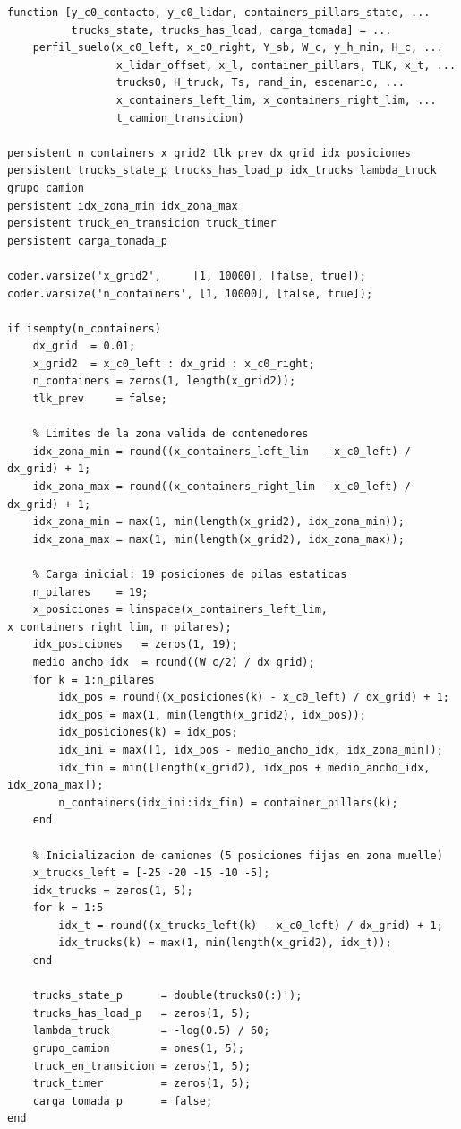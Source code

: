\documentclass[12pt, a4paper]{article}
\begin{document}
\begin{lstlisting}[style=matlab, caption={Firma e inicialización de la \textit{MATLAB Function} \texttt{perfil\_suelo}.}, label=lst:perfil-suelo-init]
function [y_c0_contacto, y_c0_lidar, containers_pillars_state, ...
          trucks_state, trucks_has_load, carga_tomada] = ...
    perfil_suelo(x_c0_left, x_c0_right, Y_sb, W_c, y_h_min, H_c, ...
                 x_lidar_offset, x_l, container_pillars, TLK, x_t, ...
                 trucks0, H_truck, Ts, rand_in, escenario, ...
                 x_containers_left_lim, x_containers_right_lim, ...
                 t_camion_transicion)

persistent n_containers x_grid2 tlk_prev dx_grid idx_posiciones
persistent trucks_state_p trucks_has_load_p idx_trucks lambda_truck grupo_camion
persistent idx_zona_min idx_zona_max
persistent truck_en_transicion truck_timer
persistent carga_tomada_p

coder.varsize('x_grid2',     [1, 10000], [false, true]);
coder.varsize('n_containers', [1, 10000], [false, true]);

if isempty(n_containers)
    dx_grid  = 0.01;
    x_grid2  = x_c0_left : dx_grid : x_c0_right;
    n_containers = zeros(1, length(x_grid2));
    tlk_prev     = false;

    % Limites de la zona valida de contenedores
    idx_zona_min = round((x_containers_left_lim  - x_c0_left) / dx_grid) + 1;
    idx_zona_max = round((x_containers_right_lim - x_c0_left) / dx_grid) + 1;
    idx_zona_min = max(1, min(length(x_grid2), idx_zona_min));
    idx_zona_max = max(1, min(length(x_grid2), idx_zona_max));

    % Carga inicial: 19 posiciones de pilas estaticas
    n_pilares    = 19;
    x_posiciones = linspace(x_containers_left_lim, x_containers_right_lim, n_pilares);
    idx_posiciones   = zeros(1, 19);
    medio_ancho_idx  = round((W_c/2) / dx_grid);
    for k = 1:n_pilares
        idx_pos = round((x_posiciones(k) - x_c0_left) / dx_grid) + 1;
        idx_pos = max(1, min(length(x_grid2), idx_pos));
        idx_posiciones(k) = idx_pos;
        idx_ini = max([1, idx_pos - medio_ancho_idx, idx_zona_min]);
        idx_fin = min([length(x_grid2), idx_pos + medio_ancho_idx, idx_zona_max]);
        n_containers(idx_ini:idx_fin) = container_pillars(k);
    end

    % Inicializacion de camiones (5 posiciones fijas en zona muelle)
    x_trucks_left = [-25 -20 -15 -10 -5];
    idx_trucks = zeros(1, 5);
    for k = 1:5
        idx_t = round((x_trucks_left(k) - x_c0_left) / dx_grid) + 1;
        idx_trucks(k) = max(1, min(length(x_grid2), idx_t));
    end

    trucks_state_p      = double(trucks0(:)');
    trucks_has_load_p   = zeros(1, 5);
    lambda_truck        = -log(0.5) / 60;
    grupo_camion        = ones(1, 5);
    truck_en_transicion = zeros(1, 5);
    truck_timer         = zeros(1, 5);
    carga_tomada_p      = false;
end
\end{lstlisting}
\end{document}
